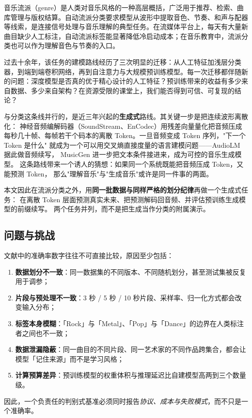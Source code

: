 \documentclass[UTF8,10pt,a4paper]{ctexart}
\begin{document}
音乐流派（genre）是人类对音乐风格的一种高层概括，广泛用于推荐、检索、曲库管理与版权结算。自动流派分类要求模型从波形中提取音色、节奏、和声与配器等线索，是连接信号处理与音乐理解的典型任务\cite{tzanetakis2002gtzan,casey2008content}。在流媒体平台上，每天有大量新曲目缺少人工标注，自动流派标签能显著降低冷启动成本；在音乐教育中，流派分类也可以作为理解音色与节奏的入口。

过去十余年，该任务的建模路线经历了三次明显的迁移：从人工特征加浅层分类器，到端到端卷积网络\cite{choi2017crnn,dieleman2014endtoend}，再到自注意力\cite{vaswani2017attention}与大规模预训练模型\cite{gong2021ast,kong2020panns}。每一次迁移都伴随新的问题：深度模型是否真的优于精心设计的人工特征？预训练带来的收益有多少来自数据、多少来自架构？在资源受限的课堂上，我们能否得到可信、可复现的结论？

与分类这条线并行的，是近三年兴起的\textbf{生成式}路线。其关键一步是把连续波形离散化：
神经音频编解码器（SoundStream、EnCodec\cite{defossez2023encodec}）用残差向量量化把音频压成
每秒几十帧、每帧若干个码本的离散 Token。一旦音频变成 Token 序列，"下一个 Token 是什么"
就成为一个可以用交叉熵直接度量的语言建模问题——AudioLM\cite{borsos2023audiolm} 据此做音频续写，
MusicGen\cite{copet2023musicgen} 进一步把文本条件接进来，成为可控的音乐生成模型。
这条路线带来一个诱人的猜想：如果同一个系统既能把音频压成 Token，又能预测 Token，
那么"理解音乐"与"生成音乐"或许是同一件事的两面。

本文因此在流派分类之外，用\textbf{同一批数据与同样严格的划分纪律}再做一个生成式任务：
在离散 Token 层面预测真实未来、把预测解码回音频、并评估预训练生成模型的前缀续写。
两个任务并列，而不是把生成当作分类的附属演示。

\subsection{问题与挑战}

文献中的准确率数字往往不可直接比较，原因至少包括：
\begin{enumerate}
  \item \textbf{数据划分不一致}：同一数据集的不同版本、不同随机划分，甚至测试集被反复用于调参；
  \item \textbf{片段与预处理不一致}：3 秒 / 5 秒 / 10 秒片段、采样率、归一化方式都会改变输入分布；
  \item \textbf{标签本身模糊}：「Rock」与「Metal」、「Pop」与「Dance」的边界在人类标注者之间也不一致；
  \item \textbf{数据泄漏隐蔽}：同一曲目的不同片段、同一艺术家的不同作品跨集合，都会让模型「记住来源」而不是学习风格；
  \item \textbf{计算预算差异}：预训练模型的权重体积与推理延迟比自建模型高两到三个数量级。
\end{enumerate}
因此，一个负责任的判别式基准必须同时报告\emph{协议、成本与失败模式}，而不只是一个准确率。
\end{document}
